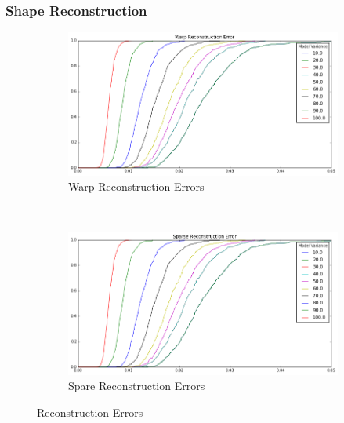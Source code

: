 \subsubsection{Shape Reconstruction}

\begin{figure}[h!]
    \centering
    \begin{subfigure}[b]{0.2\textwidth}
            \includegraphics[width=\textwidth]{resources/warp_reconstruction_error}
        \caption{Warp Reconstruction Errors}
        \label{}
    \end{subfigure}
    ~~
    \begin{subfigure}[b]{0.2\textwidth}
            \includegraphics[width=\textwidth]{resources/sparse_reconstruction_error}
        \caption{Spare Reconstruction Errors}
    \end{subfigure}
    \caption{Reconstruction Errors}
\end{figure}


